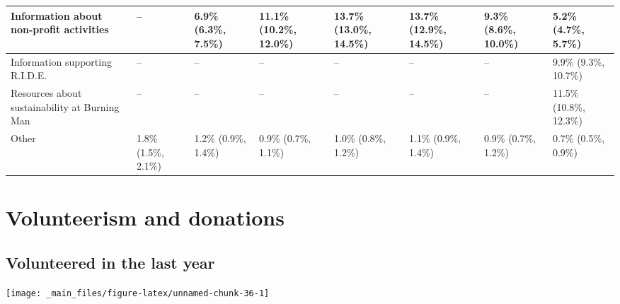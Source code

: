 \documentclass[
]{book}
\begin{document}
\begin{table}
\begin{tabular}[t]{>{}l|>{}l|>{}l|>{}l|>{}l|>{}l|>{}l|>{}l}
\hline
Information about non-profit 
 activities & -- & 6.9\% (6.3\%, 7.5\%) & 11.1\% (10.2\%, 12.0\%) & 13.7\% (13.0\%, 14.5\%) & 13.7\% (12.9\%, 14.5\%) & 9.3\% (8.6\%, 10.0\%) & 5.2\% (4.7\%, 5.7\%)\\
\hline
Information supporting R.I.D.E. & -- & -- & -- & -- & -- & -- & 9.9\% (9.3\%, 10.7\%)\\
\hline
Resources about sustainability 
 at Burning Man & -- & -- & -- & -- & -- & -- & 11.5\% (10.8\%, 12.3\%)\\
\hline
Other & 1.8\% (1.5\%, 2.1\%) & 1.2\% (0.9\%, 1.4\%) & 0.9\% (0.7\%, 1.1\%) & 1.0\% (0.8\%, 1.2\%) & 1.1\% (0.9\%, 1.4\%) & 0.9\% (0.7\%, 1.2\%) & 0.7\% (0.5\%, 0.9\%)\\
\hline
\end{tabular}
\end{table}

\hypertarget{volunteerism-and-donations}{%
\section{Volunteerism and donations}\label{volunteerism-and-donations}}

\hypertarget{volunteered-in-the-last-year}{%
\subsection{Volunteered in the last year}\label{volunteered-in-the-last-year}}

\texttt{[image: \_main\_files/figure-latex/unnamed-chunk-36-1]}
\end{document}
